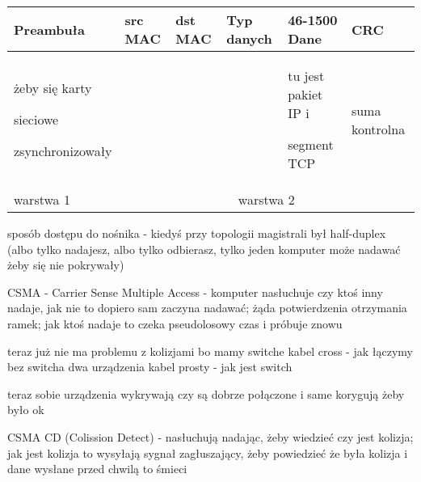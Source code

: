 \documentclass[../main.tex]{subfiles}
\begin{document}
    \begin{table}[H]
        \begin{center}
            \begin{tabular}{ | p{} | p{} | p{} | p{} | p{} | p{} | }
                \hline
                Preambuła & src MAC & dst MAC & Typ danych & 46-1500 Dane & CRC\\
                \hline
                żeby się karty

                sieciowe

                zsynchronizowały & & & & tu jest pakiet IP i

                segment TCP & suma kontrolna\\
                \hline
                warstwa 1 & \multicolumn{5}{c}{warstwa 2 }|\\
                \hline
            \end{tabular}
        \end{center}
    \end{table}

    sposób dostępu do nośnika - kiedyś przy topologii magistrali był half-duplex (albo tylko nadajesz, albo tylko odbierasz, tylko jeden komputer może nadawać żeby się nie pokrywały)

    CSMA - Carrier Sense Multiple Access - komputer nasłuchuje czy ktoś inny nadaje, jak nie to dopiero sam zaczyna nadawać; żąda potwierdzenia otrzymania ramek; jak ktoś nadaje to czeka pseudolosowy czas i próbuje znowu

    teraz już nie ma problemu z kolizjami bo mamy switche
    kabel cross - jak łączymy bez switcha dwa urządzenia
    kabel prosty - jak jest switch

    teraz sobie urządzenia wykrywają czy są dobrze połączone i same korygują żeby było ok


    CSMA CD (Colission Detect) - nasłuchują  nadając, żeby wiedzieć czy jest kolizja; jak jest kolizja to wysyłają sygnał zagłuszający, żeby powiedzieć że była kolizja i dane wysłane przed chwilą to śmieci
\end{document}
